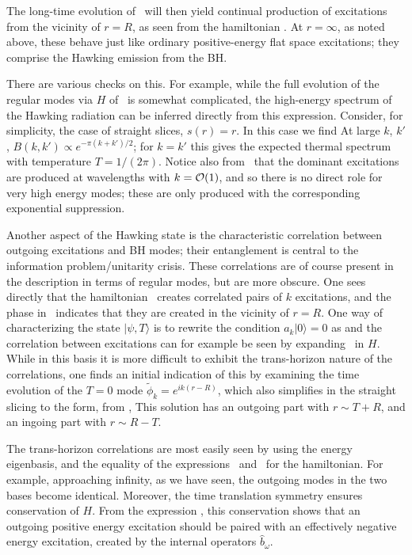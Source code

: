  
The long-time evolution of \stateevol\ will then yield continual production of excitations from the vicinity of $r=R$, as seen from the hamiltonian \hamreg.  At $r=\infty$, as noted above, these behave just like ordinary positive-energy flat space excitations; they comprise the Hawking emission from the BH.

There are various checks on this.  For example, while the full evolution of the regular modes via $H$ of \hamreg\ is somewhat complicated,
the high-energy spectrum of the Hawking radiation can be inferred directly from this expression.  Consider, for simplicity, the case of straight slices, $s(r)=r$.  In this case we find
%
\eqn{}
%
At large $k$, $k'$, $B(k,k')\propto e^{-\pi( k+k')/2}$; for $k=k'$ this  gives the expected thermal spectrum with temperature $T=1/(2\pi)$.  Notice also  from \Bstraight\ that the dominant excitations are produced at wavelengths with $k={\cal O}(1)$, and so there is no direct role for very high energy modes; these are only produced with the corresponding exponential suppression. 

Another aspect of the Hawking state is the characteristic correlation between outgoing excitations and BH modes; their entanglement is central to the information problem/unitarity crisis.  These correlations are of course present in the description in terms of regular modes, but are more obscure.  One sees directly that the hamiltonian \hamreg\ creates correlated pairs of $k$ excitations, and the phase in \Bstraight\ indicates that they are created in the vicinity of $r=R$.  
One way of characterizing the state $|\psi,T\rangle$ is to rewrite the condition $a_k|0\rangle=0$ as
%
\eqn{}
%
and the correlation between excitations can for example be seen by expanding \statecond\ in $H$.  While in this basis it is more difficult to exhibit the trans-horizon nature of the correlations, one finds an initial indication of this by examining the time evolution of the $T=0$ mode $\tilde \phi_k=e^{ik(r-R)}$, which also simplifies in the straight slicing to the form, from \XtorT,
%
\eqn{}
%
This solution has an outgoing part with $r\sim T+R$, and an ingoing part with $r\sim R-T$.  


The trans-horizon correlations are most easily seen by using the energy eigenbasis, and the equality of the expressions \hamen\ and \hamreg\ for the hamiltonian.  For example, approaching infinity, as we have seen, the outgoing modes in the two bases become identical.  Moreover, the time translation symmetry ensures conservation of $H$.  From the expression \hamen, this conservation shows that an outgoing positive energy excitation should be paired with an effectively negative energy excitation, created by the internal operators $\hat b_\omega$.  

